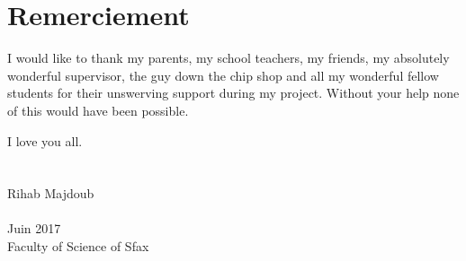 \cleardoublepage
\section*{Remerciement}
\vspace{1.0in}
I would like to thank my parents, my school teachers, my friends, my
absolutely wonderful supervisor, the guy down the chip shop and all
my wonderful fellow students for their unswerving support during my
project. Without your help none of this would have been possible.

I love you all.
\\
\\
\\
Rihab Majdoub
\\
\\
Juin 2017
\\
Faculty of Science of Sfax
